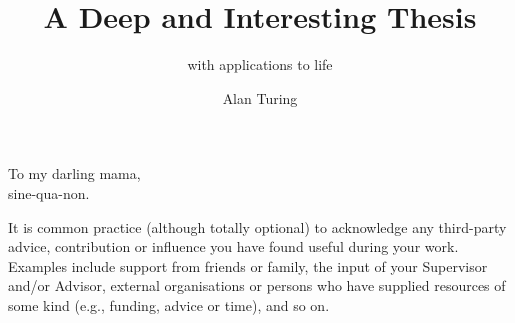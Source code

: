 \documentclass[
  bibstyle=apa, %
]{uob-thesis}
\title{A Deep and Interesting Thesis}
\subtitle{with applications to life}
\author{Alan Turing}
\date{\printdatewithoutmonth{thesisdate}}
\begin{document}

\hypersetup{pageanchor=false}
\maketitle
\cleardoubleoddemptypage

\begin{abstract}
  
\end{abstract}

\begin{dedication}
  To my darling mama,\\
  sine-qua-non.
\end{dedication}

\begin{acknowledgements}
It is common practice (although totally optional) to acknowledge any third-party
advice, contribution or influence you have found useful during your work.
Examples include support from friends or family, the input of your Supervisor
and/or Advisor, external organisations or persons who  have supplied resources
of some kind (e.g., funding, advice or time), and so on.
\end{acknowledgements}
\end{document}
